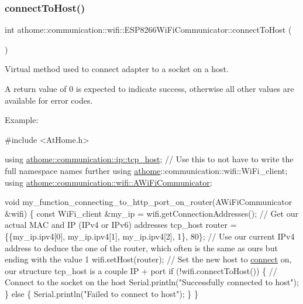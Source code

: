 \subsubsection{\texorpdfstring{connect\+To\+Host()}{connectToHost()}}
{\footnotesize\ttfamily int athome\+::communication\+::wifi\+::\+E\+S\+P8266\+Wi\+Fi\+Communicator\+::connect\+To\+Host (\begin{DoxyParamCaption}{ }\end{DoxyParamCaption})\hspace{0.3cm}{\ttfamily [virtual]}}

Virtual method used to connect adapter to a socket on a host.

A return value of 0 is expected to indicate success, otherwise all other values are available for error codes.

Example\+:


\begin{DoxyCode}
\textcolor{preprocessor}{#include <AtHome.h>}

\textcolor{keyword}{using} \mbox{\hyperlink{structathome_1_1communication_1_1ip_1_1s__host}{athome::communication::ip::tcp\_host}}; \textcolor{comment}{// Use this to not have to
       write}
the full \textcolor{keyword}{namespace }names further using
\mbox{\hyperlink{namespaceathome}{athome}}::communication::wifi::WiFi\_client; using
\mbox{\hyperlink{classathome_1_1communication_1_1wifi_1_1_a_wi_fi_communicator}{athome::communication::wifi::AWiFiCommunicator}};

void my\_function\_connecting\_to\_http\_port\_on\_router(AWiFiCommunicator &wifi)
\{ \textcolor{keyword}{const} WiFi\_client &my\_ip = wifi.getConnectionAddresses(); \textcolor{comment}{// Get our}
actual MAC and IP (IPv4 or IPv6) addresses tcp\_host router =
\{\{my\_ip.ipv4[0], my\_ip.ipv4[1], my\_ip.ipv4[2], 1\}, 80\}; \textcolor{comment}{// Use our current}
IPv4 address to deduce the one of the router, which often is the same as
ours but ending with the value 1 wifi.setHost(router); \textcolor{comment}{// Set the new host}
to \mbox{\hyperlink{classathome_1_1communication_1_1wifi_1_1_e_s_p8266_wi_fi_communicator_a58cc439be2f368b346bbbe1601a9b675}{connect}} on, our structure tcp\_host is a couple IP + port \textcolor{keywordflow}{if}
(!wifi.connectToHost()) \{ \textcolor{comment}{// Connect to the socket on the host}
    Serial.println(\textcolor{stringliteral}{"Successfully connected to host"});
  \} \textcolor{keywordflow}{else} \{
    Serial.println(\textcolor{stringliteral}{"Failed to connect to host"});
  \}
\}
\end{DoxyCode}
 

